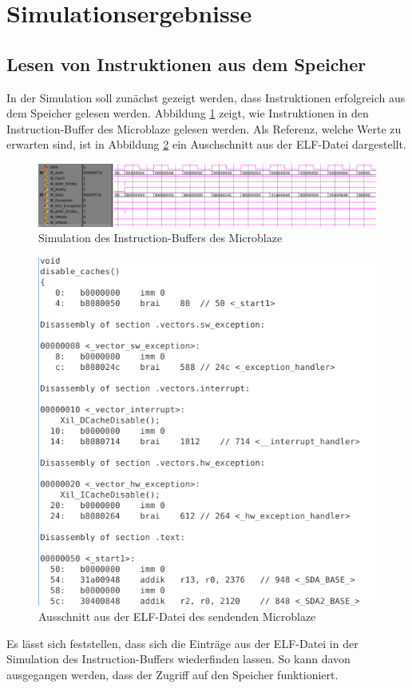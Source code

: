 \section{Simulationsergebnisse}\label{sec:simRes}
\subsection{Lesen von Instruktionen aus dem Speicher}
In der Simulation soll zunächst gezeigt werden, dass Instruktionen erfolgreich aus dem Speicher gelesen werden. Abbildung \ref{fig:InstFetch} zeigt, wie Instruktionen in den Instruction-Buffer des Microblaze gelesen werden. Als Referenz, welche Werte zu erwarten sind, ist in Abbildung \ref{fig:ELF_Snap} ein Auschschnitt aus der ELF-Datei dargestellt.

\begin{figure}[th!]
\centering
\includegraphics[width=1\linewidth]{./bilder/InstFetch}
\caption{Simulation des Instruction-Buffers des Microblaze}
\label{fig:InstFetch}
\end{figure}
\begin{figure}[th!]
\centering
\includegraphics[width=0.7\linewidth]{./bilder/ELF_Snap}
\caption{Ausschnitt aus der ELF-Datei des sendenden Microblaze}
\label{fig:ELF_Snap}
\end{figure}
\noindent
Es lässt sich feststellen, dass sich die Einträge aus der ELF-Datei in der Simulation des Instruction-Buffers wiederfinden lassen. So kann davon ausgegangen werden, dass der Zugriff auf den Speicher funktioniert.
